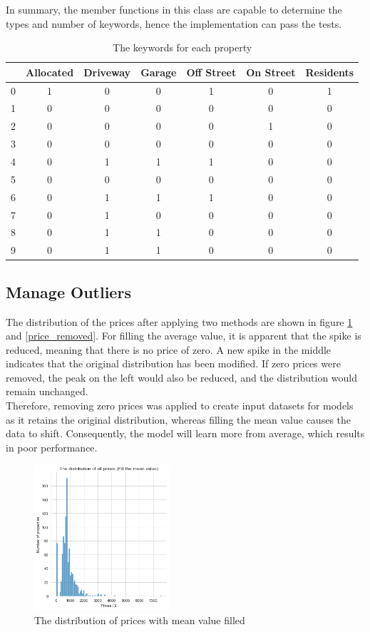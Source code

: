 \documentclass[12pt,twoside]{report}
\begin{document}
In summary,  the member functions in this class are capable to determine the types and number of keywords, hence the implementation can pass the tests.

\begin{table}[h]
	\centering
	\caption{The keywords for each property}
	\label{parking_types}
	\begin{tabular}{| c | c | c | c | c | c | c |}
		\hline
		& Allocated & Driveway & Garage & Off Street & On Street & Residents\\
		\hline
		0 & 1 & 0 & 0 & 1 & 0 & 1 \\ 
		\hline
		1 & 0 & 0 & 0 & 0 & 0 & 0 \\
		\hline
		2 & 0 & 0 & 0 & 0 & 1 & 0 \\
		\hline
		3 & 0 & 0 & 0 & 0 & 0 & 0 \\
		\hline
		4 & 0 & 1 & 1 & 1 & 0 & 0 \\
		\hline
		5 & 0 & 0 & 0 & 0 & 0 & 0 \\
		\hline
		6 & 0 & 1 & 1 & 1 & 0 & 0 \\
		\hline
		7 & 0 & 1 & 0 & 0 & 0 & 0 \\
		\hline
		8 & 0 & 1 & 1 & 0 & 0 & 0 \\
		\hline
		9 & 0 & 1 & 1 & 0 & 0 & 0 \\
		\hline
	\end{tabular}
\end{table}

\subsection{Manage Outliers}
The distribution of the prices after applying two methods are shown in figure \ref{price_filled} and \ref{price_removed}. For filling the average value, it is apparent that the spike is reduced, meaning that there is no price of zero. A new spike in the middle indicates that the original distribution has been modified. If zero prices were removed, the peak on the left would also be reduced, and the distribution would remain unchanged. 
\\

Therefore, removing zero prices was applied to create input datasets for models as it retains the original distribution, whereas filling the mean value causes the data to shift. Consequently, the model will learn more from average, which results in poor performance. 

\begin{figure}[h]
	\centering
	\includegraphics[width=5cm]{price_all_mean}
	\caption{The distribution of prices with mean value filled}
	\label{price_filled}
\end{figure}
\end{document}
